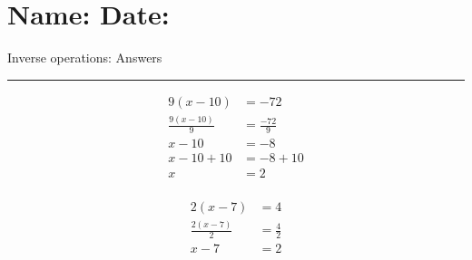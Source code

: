 \documentclass[12pt]{article}
\def \HeadingAnswers {\section*{\Large Name: \underline{\hspace{8cm}} \hfill Date: \underline{\hspace{3cm}}} \vspace{-3mm}
{Inverse operations: Answers} \vspace{1pt}\hrule}
\newcounter{minipagecount}
\begin{document}
\HeadingAnswers
\vspace{1mm}
\begin{multicols}{2}
\noindent{(\theminipagecount)}\hspace{0.1mm} %
\begin{minipage}[t]{0.45\textwidth} %
    \vspace{-26pt}  %
    \raggedright %
    \begin{align*} %
        9(x - 10) &= -72\\
        \frac{9(x-10)}{9} &= \frac{-72}{9}\\
        x - 10 &= -8\\
        x - 10 + 10 &= -8 + 10\\
        x &= 2\\
    \end{align*}
\end{minipage} %
\noindent{(\theminipagecount)}\hspace{0.1mm} %
\begin{minipage}[t]{0.45\textwidth} %
    \vspace{-26pt}  %
    \raggedright %
    \begin{align*} %
        2(x - 7) &= 4\\
        \frac{2(x-7)}{2} &= \frac{4}{2}\\
        x - 7 &= 2\\

\end{align*}
\end{minipage}
\end{multicols}
\end{document}
